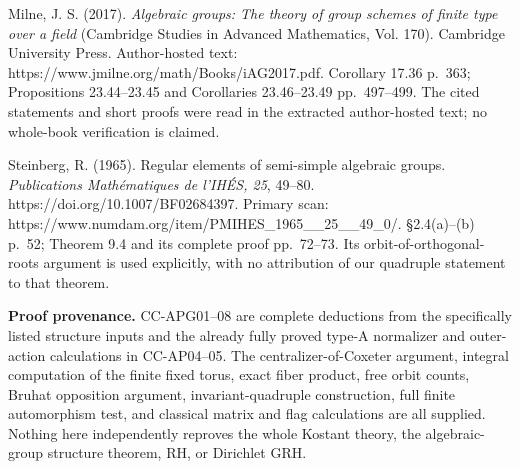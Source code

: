 Milne, J. S. (2017). \emph{Algebraic groups: The theory of group schemes
of finite type over a field} (Cambridge Studies in Advanced Mathematics,
Vol. 170). Cambridge University Press. Author-hosted text:
https://www.jmilne.org/math/Books/iAG2017.pdf. Corollary 17.36 p.~363;
Propositions 23.44--23.45 and Corollaries 23.46--23.49 pp.~497--499. The
cited statements and short proofs were read in the extracted
author-hosted text; no whole-book verification is claimed.

Steinberg, R. (1965). Regular elements of semi-simple algebraic groups.
\emph{Publications Mathématiques de l'IHÉS, 25}, 49--80.
https://doi.org/10.1007/BF02684397. Primary scan:
https://www.numdam.org/item/PMIHES\_1965\_\_25\_\_49\_0/. §2.4(a)--(b)
p.~52; Theorem 9.4 and its complete proof pp.~72--73. Its
orbit-of-orthogonal-roots argument is used explicitly, with no
attribution of our quadruple statement to that theorem.

\textbf{Proof provenance.} CC-APG01--08 are complete deductions from the
specifically listed structure inputs and the already fully proved type-A
normalizer and outer-action calculations in CC-AP04--05. The
centralizer-of-Coxeter argument, integral computation of the finite
fixed torus, exact fiber product, free orbit counts, Bruhat opposition
argument, invariant-quadruple construction, full finite automorphism
test, and classical matrix and flag calculations are all supplied.
Nothing here independently reproves the whole Kostant theory, the
algebraic-group structure theorem, RH, or Dirichlet GRH.
